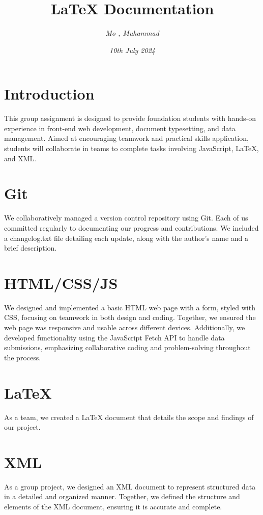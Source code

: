 \documentclass{article}
\title{\textbf{LaTeX Documentation}}
\author{\textit{Mo , Muhammad}}
\date{\textit{10th July 2024}}
\begin{document}
\maketitle

\section{Introduction}
This group assignment is designed to provide foundation students with hands-on experience in front-end web development, document typesetting, and data management. Aimed at encouraging teamwork and practical skills application, students will collaborate in teams to complete tasks involving JavaScript, LaTeX, and XML.

\section{Git}

We collaboratively managed a version control repository using Git. Each of us committed regularly to documenting our progress and contributions. We included a changelog.txt file detailing each update, along with the author's name and a brief description.

\section{HTML/CSS/JS}

We designed and implemented a basic HTML web page with a form, styled with CSS, focusing on teamwork in both design and coding. Together, we ensured the web page was responsive and usable across different devices. Additionally, we developed functionality using the JavaScript Fetch API to handle data submissions, emphasizing collaborative coding and problem-solving throughout the process.

\section{LaTeX}

As a team, we created a LaTeX document that details the scope and findings of our project.

\section{XML}

As a group project, we designed an XML document to represent structured data in a detailed and organized manner. Together, we defined the structure and elements of the XML document, ensuring it is accurate and complete.
\end{document}
